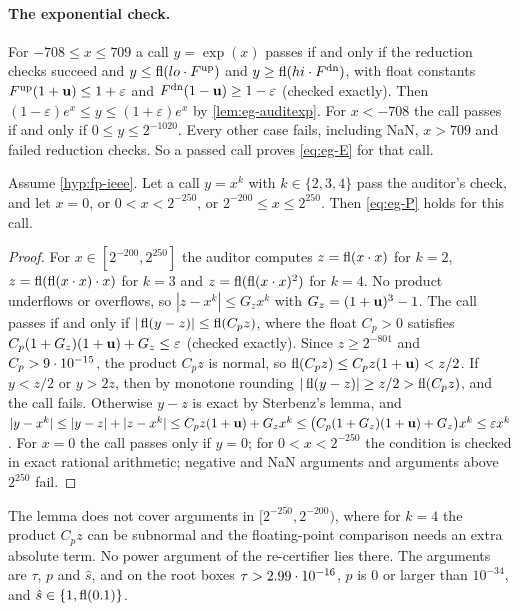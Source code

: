 \paragraph{The exponential check.}
For $-708\le x\le709$ a call $y=\exp(x)$ passes if and only if the reduction checks succeed and
$y\le\operatorname{fl}(lo\cdot F^{\mathrm{up}})$ and $y\ge\operatorname{fl}(hi\cdot F^{\mathrm{dn}})$, with float constants $F^{\mathrm{up}}(1+\mathbf{u})\le1+\varepsilon$ and $F^{\mathrm{dn}}(1-\mathbf{u})\ge1-\varepsilon$ (checked exactly).
Then $(1-\varepsilon)e^x\le y\le(1+\varepsilon)e^x$ by \cref{lem:eg-auditexp}.
For $x<-708$ the call passes if and only if $0\le y\le2^{-1020}$.
Every other case fails, including NaN, $x>709$ and failed reduction checks.
So a passed call proves \eqref{eq:eg-E} for that call.

\begin{lemma}\label{lem:eg-auditpow}
Assume \cref{hyp:fp-ieee}.
Let a call $y=x^k$ with $k\in\{2,3,4\}$ pass the auditor's check, and let $x=0$, or $0<x<2^{-250}$, or $2^{-200}\le x\le2^{250}$.
Then \eqref{eq:eg-P} holds for this call.
\end{lemma}

\begin{proof}
For $x\in[2^{-200},2^{250}]$ the auditor computes $z=\operatorname{fl}(x\cdot x)$ for $k=2$, $z=\operatorname{fl}(\operatorname{fl}(x\cdot x)\cdot x)$ for $k=3$ and $z=\operatorname{fl}(\operatorname{fl}(x\cdot x)^2)$ for $k=4$.
No product underflows or overflows, so $|z-x^k|\le G_zx^k$ with $G_z=(1+\mathbf{u})^3-1$.
The call passes if and only if $|\operatorname{fl}(y-z)|\le\operatorname{fl}(C_pz)$, where the float $C_p>0$ satisfies $C_p(1+G_z)(1+\mathbf{u})+G_z\le\varepsilon$ (checked exactly).
Since $z\ge2^{-801}$ and $C_p>9\cdot 10^{-15}$, the product $C_pz$ is normal, so $\operatorname{fl}(C_pz)\le C_pz(1+\mathbf{u})<z/2$.
If $y<z/2$ or $y>2z$, then by monotone rounding $|\operatorname{fl}(y-z)|\ge z/2>\operatorname{fl}(C_pz)$, and the call fails.
Otherwise $y-z$ is exact by Sterbenz's lemma, and $|y-x^k|\le|y-z|+|z-x^k|\le C_pz(1+\mathbf{u})+G_zx^k\le\bigl(C_p(1+G_z)(1+\mathbf{u})+G_z\bigr)x^k\le\varepsilon x^k$.
For $x=0$ the call passes only if $y=0$; for $0<x<2^{-250}$ the condition is checked in exact rational arithmetic; negative and NaN arguments and arguments above $2^{250}$ fail.
\end{proof}

The lemma does not cover arguments in $[2^{-250},2^{-200})$, where for $k=4$ the product $C_pz$ can be subnormal and the floating-point comparison needs an extra absolute term.
No power argument of the re-certifier lies there.
The arguments are $\tau$, $p$ and $\hat s$, and on the root boxes $\tau>2.99\cdot 10^{-16}$, $p$ is $0$ or larger than $10^{-34}$, and $\hat s\in\{1,\operatorname{fl}(0.1)\}$.

